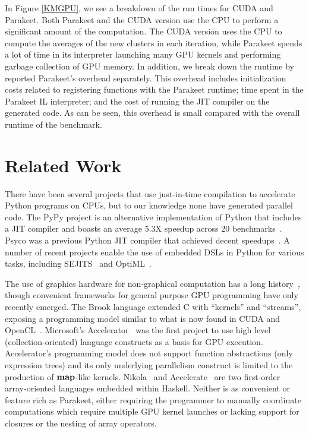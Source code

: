 \documentclass[10pt,twocolumn]{article}
\begin{document}
In Figure \ref{KMGPU}, we see a breakdown of the run times for CUDA and Parakeet.  Both Parakeet and the CUDA version use the CPU to perform a significant amount of the computation.  The CUDA version uses the CPU to compute the averages of the new clusters in each iteration, while Parakeet spends a lot of time in its interpreter launching many GPU kernels and performing garbage collection of GPU memory.  In addition, we break down the runtime by reported Parakeet's overhead separately.  This overhead includes initialization costs related to registering functions with the Parakeet runtime; time spent in the Parakeet IL interpreter; and the cost of running the JIT compiler on the generated code.  As can be seen, this overhead is small compared with the overall runtime of the benchmark.

\section{Related Work}
\label{RelatedWork}
There have been several projects that use just-in-time compilation to accelerate Python programs on CPUs, but to our knowledge none have generated parallel code.  The PyPy project is an alternative implementation of Python that includes a JIT compiler and boasts an average 5.3X speedup across 20 benchmarks~\cite{Rigo06}. Psyco was a previous Python JIT compiler that achieved decent speedups~\cite{Rigo04}.  A number of recent projects enable the use of embedded DSLs in Python for various tasks, including SEJITS~\cite{Cook11} and OptiML~\cite{Chaf11}.

The use of graphics hardware for non-graphical computation has a long history~\cite{Leng90}, though convenient frameworks for general purpose GPU programming have only recently emerged. The Brook language extended C with ``kernels'' and ``streams'', exposing a programming model similar to what is now found in CUDA and OpenCL~\cite{Buck04}.  Microsoft's Accelerator~\cite{Tard06} was the first project to use high level (collection-oriented) language constructs as a basis for GPU execution. Accelerator's programming model does not support function abstractions (only expression trees) and its only underlying parallelism construct is limited to the production of $\mbox{\textbf{map}}$-like kernels.  Nikola~\cite{Main10} and Accelerate~\cite{Chak11} are two first-order array-oriented languages embedded within Haskell. Neither is as convenient or feature rich as Parakeet, either requiring the programmer to manually coordinate computations which require multiple GPU kernel launches or lacking support for closures or the nesting of array operators.
\end{document}
